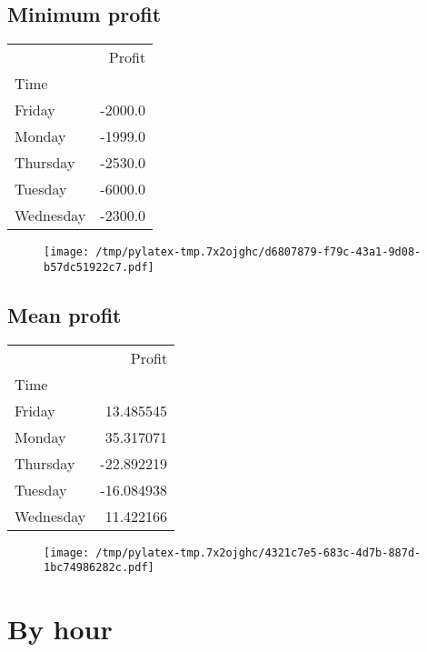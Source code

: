 \documentclass{article}%
\begin{document}
\subsection{Minimum profit }%
\label{subsec:Minimumprofit}%
\begin{tabular}{lr}
\toprule
{} &  Profit \\
Time      &         \\
\midrule
Friday    & -2000.0 \\
Monday    & -1999.0 \\
Thursday  & -2530.0 \\
Tuesday   & -6000.0 \\
Wednesday & -2300.0 \\
\bottomrule
\end{tabular}
%


\begin{figure}[htbp]%
\centering%
\texttt{[image: /tmp/pylatex-tmp.7x2ojghc/d6807879-f79c-43a1-9d08-b57dc51922c7.pdf]}%
\end{figure}

%
\newpage %
\subsection{Mean profit }%
\label{subsec:Meanprofit}%
\begin{tabular}{lr}
\toprule
{} &     Profit \\
Time      &            \\
\midrule
Friday    &  13.485545 \\
Monday    &  35.317071 \\
Thursday  & -22.892219 \\
Tuesday   & -16.084938 \\
Wednesday &  11.422166 \\
\bottomrule
\end{tabular}
%


\begin{figure}[htbp]%
\centering%
\texttt{[image: /tmp/pylatex-tmp.7x2ojghc/4321c7e5-683c-4d7b-887d-1bc74986282c.pdf]}%
\end{figure}

%
\newpage %
\section{By hour}%
\label{sec:Byhour}%
\end{document}
